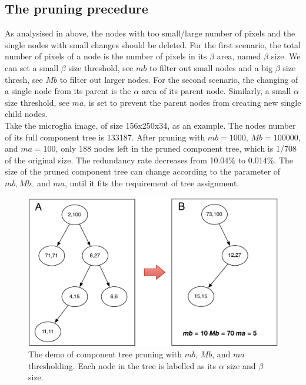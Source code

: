 \subsection{The pruning precedure}
As analysised in above, the nodes with too small/large number of pixels and the single nodes with small changes should be deleted. For the first scenario, the total number of pixels of a node is the number of pixels in its $\beta$ area, named $\beta$ size. We can set a small $\beta$ size threshold, see $mb$ to filter out small nodes and a big $\beta$ size thresh, see $Mb$ to filter out larger nodes. For the second scenario, the changing of a single node from its parent is the $\alpha$ area of its parent node. Similarly, a small $\alpha$ size threshold, see $ma$, is set to prevent the parent nodes from creating new single child nodes.\\
Take the microglia image, of size 156x250x34, as an example. The nodes number of its full component tree is 133187. After pruning with $mb = 1000$, $Mb = 100000$, and $ ma = 100$, only 188 nodes left in the pruned component tree, which is 1/708 of the original size. The redundancy rate decreases from 10.04\% to 0.014\%. The size of the pruned component tree can change according to the parameter of $mb, Mb,$ and $ma$, until it fits the requirement of tree assignment.

\begin{figure}[htbp]
\centering
\includegraphics[width=1.0\textwidth]{images/cptree_pruning}
\caption[Demo of component tree pruning]{The demo of component tree pruning with $mb$, $Mb$, and $ma$ thresholding. Each node in the tree is labelled as its $\alpha$ size and $\beta$ size.}
\label{fig:cptree-pruning}
\end{figure}

